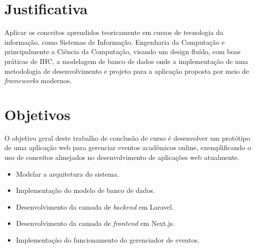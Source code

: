 

\section{Justificativa}

Aplicar os conceitos aprendidos teoricamente em cursos de tecnologia da informação, como Sistemas de Informação, Engenharia da Computação e principalmente a Ciência da Computação, visando um design fluído, com boas práticas de IHC, a modelagem de banco de dados onde a implementação de uma metodologia de desenvolvimento e projeto para a aplicação proposta por meio de \textit{frameworks} modernos.


\section{Objetivos}
O objetivo geral deste trabalho de conclusão de curso é desenvolver um protótipo de uma aplicação web para gerenciar eventos acadêmicos online, exemplificando o uso de conceitos almejados no desenvolvimento de aplicações web atualmente. 


\begin{itemize}
    \item Modelar a arquitetura do sistema.
    \item Implementação do modelo de banco de dados.
    \item Desenvolvimento da camada de \textit{backend} em Laravel.
    \item Desenvolvimento da camada de \textit{frontend} em Next.js.
    \item Implementação do funcionamento do gerenciador de eventos.
\end{itemize}


